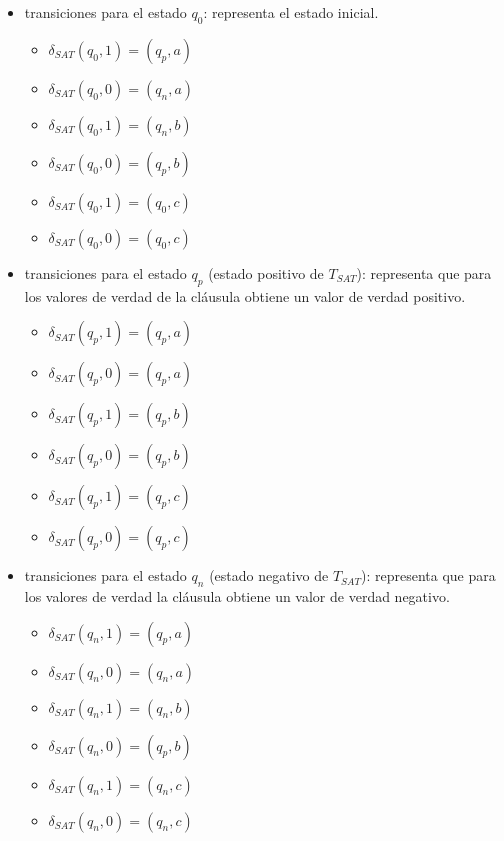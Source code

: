\documentclass{article}
\begin{document}
\begin{itemize}
    \item  transiciones para el estado $q_0$: representa el estado inicial.
          \begin{multicols}{2}
              \begin{itemize}
                  \item $\delta_{SAT}(q_0,1)=(q_p,a)$
                  \item $\delta_{SAT}(q_0,0)=(q_n,a)$
                  \item $\delta_{SAT}(q_0,1)=(q_n,b)$
                  \item $\delta_{SAT}(q_0,0)=(q_p,b)$
                  \item $\delta_{SAT}(q_0,1)=(q_0,c)$
                  \item $\delta_{SAT}(q_0,0)=(q_0,c)$
              \end{itemize}
          \end{multicols}
          
    \item  transiciones para el estado $q_p$ (estado positivo de $T_{SAT}$): representa que para los valores de verdad de la cláusula obtiene un valor de verdad positivo.
          \begin{multicols}{2}
              \begin{itemize}
                  \item $\delta_{SAT}(q_{p},1)=(q_{p},a)$
                  \item $\delta_{SAT}(q_{p},0)=(q_{p},a)$
                  \item $\delta_{SAT}(q_{p},1)=(q_{p},b)$
                  \item $\delta_{SAT}(q_{p},0)=(q_{p},b)$
                  \item $\delta_{SAT}(q_{p},1)=(q_{p},c)$
                  \item $\delta_{SAT}(q_{p},0)=(q_{p},c)$
              \end{itemize}
          \end{multicols}
          
    \item  transiciones para el estado $q_n$ (estado negativo de $T_{SAT}$): representa que para los valores de verdad la cláusula obtiene un valor de verdad negativo.
          \begin{multicols}{2}
              \begin{itemize}
                  \item $\delta_{SAT}(q_{n},1)=(q_{p},a)$
                  \item $\delta_{SAT}(q_{n},0)=(q_{n},a)$
                  \item $\delta_{SAT}(q_{n},1)=(q_{n},b)$
                  \item $\delta_{SAT}(q_{n},0)=(q_{p},b)$
                  \item $\delta_{SAT}(q_{n},1)=(q_{n},c)$
                  \item $\delta_{SAT}(q_{n},0)=(q_{n},c)$
              \end{itemize}
          \end{multicols}
\end{itemize}
\end{document}
